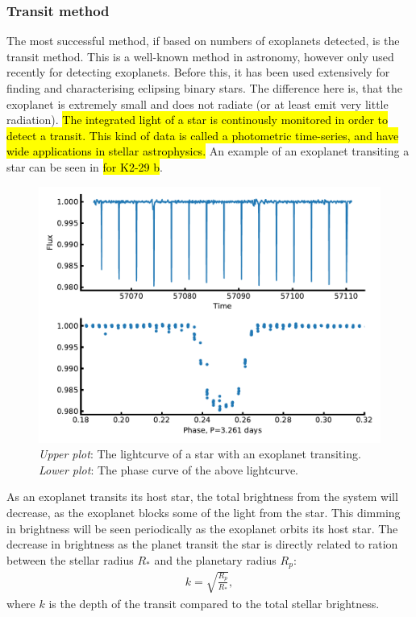 \subsubsection{Transit method}
\label{sec:transitMethod}

The most successful method, if based on numbers of exoplanets detected, is the transit method. This
is a well-known method in astronomy, however only used recently for detecting exoplanets. Before
this, it has been used extensively for finding and characterising eclipsing binary stars. The
difference here is, that the exoplanet is extremely small and does not radiate (or at least emit
very little radiation). \hl{The integrated light of a star is continously monitored in order to
detect a transit. This kind of data is called a photometric time-series, and have wide applications
in stellar astrophysics.} An example of an exoplanet transiting a star can be seen in
 \hl{for K2-29 b}.

\begin{figure}[htpb!]
    \centering
    \includegraphics[width=1.0\linewidth]{figures/transitMethod.pdf}
    \caption{\emph{Upper plot}: The lightcurve of a star with an exoplanet transiting.
             \emph{Lower plot}: The phase curve of the above lightcurve.}
    \label{fig:transitMethod}
\end{figure}

As an exoplanet transits its host star, the total brightness from the system will decrease, as the
exoplanet blocks some of the light from the star. This dimming in brightness will be seen
periodically as the exoplanet orbits its host star. The decrease in brightness as the planet transit
the star is directly related to ration between the stellar radius $R_\ast$ and the planetary radius
$R_p$:
\begin{align}
  k = \sqrt{\frac{R_p}{R_\ast}},  \label{eq:transit}
\end{align}
where $k$ is the depth of the transit compared to the total stellar brightness.

